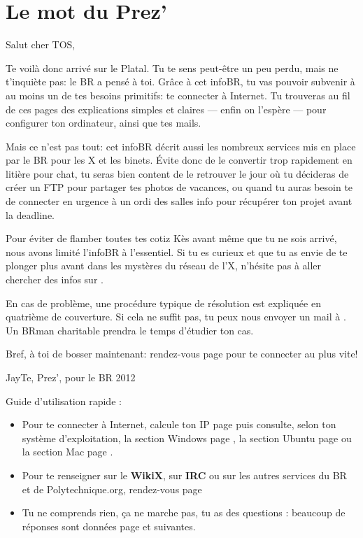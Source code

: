 \thispagestyle{empty}

\section*{Le mot du Prez'}

\vspace{1em}

Salut cher TOS,
\vspace{1em}

Te voil\`a donc arriv\'e sur le Platal. Tu te sens peut-être un peu perdu, mais ne t'inqui\`ete pas: le BR a pens\'e \`a toi. Gr\^ace \`a cet infoBR, tu vas pouvoir subvenir \`a au moins un de tes besoins primitifs: te connecter \`a Internet. Tu trouveras au fil de ces pages des explications simples et claires --- enfin on l'esp\`ere --- pour configurer ton ordinateur, ainsi que tes mails.

Mais ce n'est pas tout: cet infoBR d\'ecrit aussi les nombreux services mis en place par le BR pour les X et les binets. \'Evite donc de le convertir trop rapidement en liti\`ere pour chat, tu seras bien content de le retrouver le jour o\`u tu d\'ecideras de cr\'eer un FTP pour partager tes photos de vacances, ou quand tu auras besoin te de connecter en urgence à un ordi des salles info pour r\'ecup\'erer ton projet avant la deadline.

Pour \'eviter de flamber toutes tes cotiz K\`es avant m\^eme que tu ne sois arriv\'e, nous avons limit\'e l'infoBR \`a l'essentiel. Si tu es curieux et que tu as envie de te plonger plus avant dans les myst\`eres du r\'eseau de l'X, n'h\'esite pas \`a aller chercher des infos sur .

\vspace{1em}
En cas de probl\`eme, une proc\'edure typique de r\'esolution est expliqu\'ee en quatri\`eme de couverture. Si cela ne suffit pas, tu peux nous envoyer un mail \`a . Un BRman charitable prendra le temps d'\'etudier ton cas.

Bref, \`a toi de bosser maintenant: rendez-vous page \pageref{ip} pour te connecter au plus vite!

\vspace{3em}
\hfill JayTe, Prez', pour le BR 2012


\vfill


Guide d'utilisation rapide :
\begin{itemize}
\item Pour te connecter \`a Internet, calcule ton IP page \pageref{ip} puis consulte, selon ton syst\`eme d'exploitation, la section Windows page \pageref{windows},
la section Ubuntu page \pageref{ubuntu} ou la section Mac page \pageref{mac}.
\item Pour te renseigner sur le \textbf{WikiX}, sur \textbf{IRC} ou sur les autres services du BR et de Polytechnique.org, rendez-vous page \pageref{services}
\item Tu ne comprends rien, \c{c}a ne marche pas, tu as des questions : beaucoup de r\'eponses sont donn\'ees page \pageref{faq} et suivantes.

\end{itemize}


